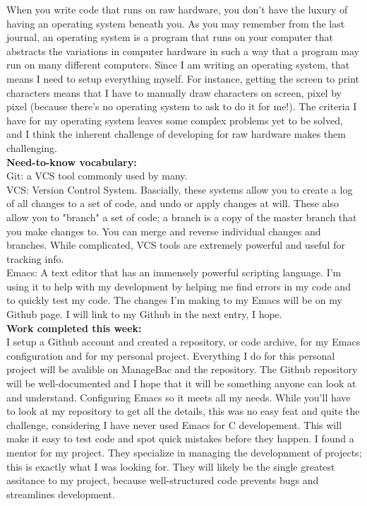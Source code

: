 \documentclass[11pt]{article}
\begin{document}
When you write code that runs on raw hardware, you don't have the luxury of having an operating system beneath you. As you may remember from the last journal, an operating system is a program that runs on your computer that abstracts the variations in computer hardware in such a way that a program may run on many different computers. Since I am writing an operating system, that means I need to setup everything myself. For instance, getting the screen to print characters means that I have to manually draw characters on screen, pixel by pixel (because there's no operating system to ask to do it for me!). The criteria I have for my operating system leaves some complex problems yet to be solved, and I think the inherent challenge of developing for raw hardware makes them challenging.\\
\textbf{Need-to-know vocabulary:}\\
Git: a VCS tool commonly used by many. \\
VCS: Version Control System. Bascially, these systems allow you to create a log of all changes to a set of code, and undo or apply changes at will. These also allow you to "branch" a set of code; a branch is a copy of the master branch that you make changes to. You can merge and reverse individual changes and branches. While complicated, VCS tools are extremely powerful and useful for tracking info.\\
Emacs: A text editor that has an immensely powerful scripting language. I'm using it to help with my development by helping me find errors in my code and to quickly test my code. The changes I'm making to my Emacs will be on my Github page. I will link to my Github in the next entry, I hope.\\
\textbf{Work completed this week:}\\
I setup a Github account and created a repository, or code archive, for my Emacs configuration and for my personal project. Everything I do for this personal project will be avalible on ManageBac and the repository. The Github repository will be well-documented and I hope that it will be something anyone can look at and understand.
Configuring Emacs so it meets all my needs. While you'll have to look at my repository to get all the details, this was no easy feat and quite the challenge, considering I have never used Emacs for C developement. This will make it easy to test code and spot quick mistakes before they happen.
I found a mentor for my project. They specialize in managing the developnment of projects; this is exactly what I was looking for. They will likely be the single greatest assitance to my project, because well-structured code prevents bugs and streamlines development.
\end{document}

